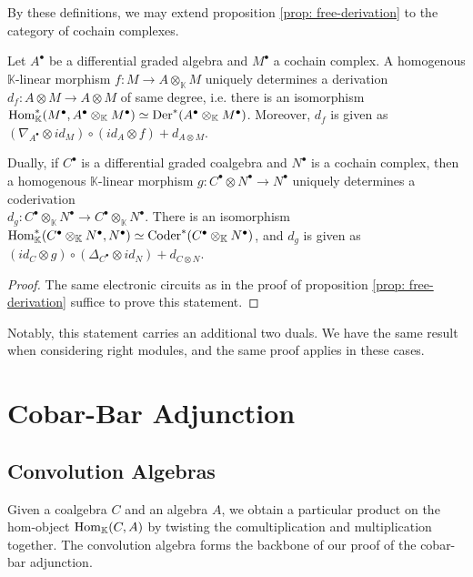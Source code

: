 \documentclass[../thesis.tex]{subfiles}
\begin{document}
            By these definitions, we may extend proposition \ref{prop: free-derivation} to the category of cochain complexes.

            \begin{corollary}\label{cor: dg-free-derivation}
                Let $A^\bullet$ be a differential graded algebra and $M^\bullet$ a cochain complex. A homogenous $\mathbb{K}$-linear morphism $f:M\rightarrow A\otimes_{\mathbb{K}} M$ uniquely determines a derivation \\ $d_f:A\otimes M\rightarrow A\otimes M$ of same degree, i.e. there is an isomorphism \\ $\tt{Hom}_{\mathbb{K}}^*(M^\bullet,A^\bullet\otimes_{\mathbb{K}}M^\bullet)\simeq \tt{Der}^*(A^\bullet\otimes_{\mathbb{K}}M^\bullet)$. Moreover, $d_f$ is given as $(\nabla_{A^\bullet}\otimes id_M)\circ (id_A\otimes f) + d_{A\otimes M}$.

                Dually, if $C^\bullet$ is a differential graded coalgebra and $N^\bullet$ is a cochain complex, then a homogenous $\mathbb{K}$-linear morphism $g:C^\bullet\otimes N^\bullet\rightarrow N^\bullet$ uniquely determines a coderivation \\ $d_g:C^\bullet\otimes_{\mathbb{K}}N^\bullet\rightarrow C^\bullet\otimes_{\mathbb{K}}N^\bullet$. There is an isomorphism $\tt{Hom}_{\mathbb{K}}^*(C^\bullet\otimes_{\mathbb{K}}N^\bullet,N^\bullet)\simeq \tt{Coder}^*(C^\bullet\otimes_{\mathbb{K}}N^\bullet)$, and $d_g$ is given as $(id_C\otimes g)\circ (\Delta_{C^\bullet}\otimes id_N) + d_{C\otimes N}$.
            \end{corollary}

            \begin{proof}
                The same electronic circuits as in the proof of proposition \ref{prop: free-derivation} suffice to prove this statement.
            \end{proof}

            Notably, this statement carries an additional two duals. We have the same result when considering right modules, and the same proof applies in these cases.
    \section{Cobar-Bar Adjunction}
    \subsection{Convolution Algebras}

            Given a coalgebra $C$ and an algebra $A$, we obtain a particular product on the hom-object $\tt{Hom}_\mathbb{K}(C, A)$ by twisting the comultiplication and multiplication together. The convolution algebra forms the backbone of our proof of the cobar-bar adjunction.
\end{document}
